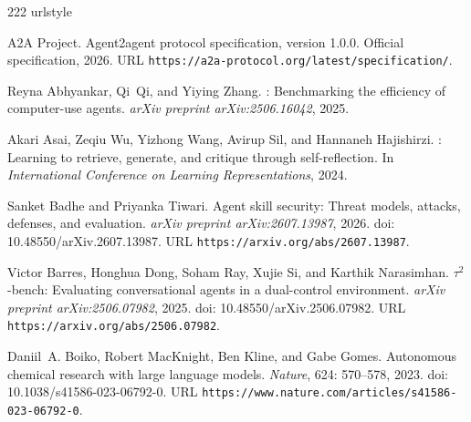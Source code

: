\begin{thebibliography}{222}
\providecommand{\natexlab}[1]{#1}
\providecommand{\url}[1]{\texttt{#1}}
\expandafter\ifx\csname urlstyle\endcsname\relax
  \providecommand{\doi}[1]{doi: #1}\else
  \providecommand{\doi}{doi: \begingroup \urlstyle{rm}\Url}\fi

{A2A Project}.
\newblock Agent2agent protocol specification, version 1.0.0.
\newblock Official specification, 2026.
\newblock URL \url{https://a2a-protocol.org/latest/specification/}.

Reyna Abhyankar, Qi~Qi, and Yiying Zhang.
: Benchmarking the efficiency of computer-use agents.
\newblock \emph{arXiv preprint arXiv:2506.16042}, 2025.

Akari Asai, Zeqiu Wu, Yizhong Wang, Avirup Sil, and Hannaneh Hajishirzi.
: Learning to retrieve, generate, and critique through
  self-reflection.
\newblock In \emph{International Conference on Learning Representations}, 2024.

Sanket Badhe and Priyanka Tiwari.
\newblock Agent skill security: Threat models, attacks, defenses, and
  evaluation.
\newblock \emph{arXiv preprint arXiv:2607.13987}, 2026.
\newblock \doi{10.48550/arXiv.2607.13987}.
\newblock URL \url{https://arxiv.org/abs/2607.13987}.

Victor Barres, Honghua Dong, Soham Ray, Xujie Si, and Karthik Narasimhan.
\newblock $\tau^2$-bench: Evaluating conversational agents in a dual-control
  environment.
\newblock \emph{arXiv preprint arXiv:2506.07982}, 2025.
\newblock \doi{10.48550/arXiv.2506.07982}.
\newblock URL \url{https://arxiv.org/abs/2506.07982}.

Daniil~A. Boiko, Robert MacKnight, Ben Kline, and Gabe Gomes.
\newblock Autonomous chemical research with large language models.
\newblock \emph{Nature}, 624: 570--578, 2023.
\newblock \doi{10.1038/s41586-023-06792-0}.
\newblock URL \url{https://www.nature.com/articles/s41586-023-06792-0}.


\end{thebibliography}
